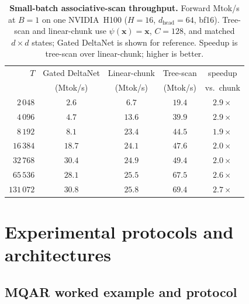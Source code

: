 \documentclass{article}
\newcommand{\1}{\bm{1}}
\def\vx{{\bm{x}}}
\newcommand{\seql}{T}
\theoremstyle{definition}
\begin{document}
\begin{table}[htbp]
    \centering\footnotesize
    \caption{\textbf{Small-batch associative-scan throughput.}
    Forward Mtok/s at $B{=}1$ on one NVIDIA~H100
    ($H{=}16$, $d_\text{head}{=}64$, bf16). Tree-scan and linear-chunk use
    $\psi(\vx){=}\vx$, $C{=}128$, and matched $d{\times}d$ states; Gated DeltaNet
    is shown for reference. Speedup is tree-scan over linear-chunk; higher is better.}
    \label{tab:treescan}
    \begin{tabular}{r|c|cc|c}
    \toprule
    $\seql$ & Gated DeltaNet & Linear-chunk & Tree-scan & speedup \\
        & (Mtok/s) & (Mtok/s) & (Mtok/s) & vs.\ chunk \\
    \midrule
    $2\,048$   & $2.6$  & $6.7$  & $\mathbf{19.4}$ & $2.9\times$ \\
    $4\,096$   & $4.7$  & $13.6$ & $\mathbf{39.9}$ & $2.9\times$ \\
    $8\,192$   & $8.1$  & $23.4$ & $\mathbf{44.5}$ & $1.9\times$ \\
    $16\,384$  & $18.7$ & $24.1$ & $\mathbf{47.6}$ & $2.0\times$ \\
    $32\,768$  & $30.4$ & $24.9$ & $\mathbf{49.4}$ & $2.0\times$ \\
    $65\,536$  & $28.1$ & $25.5$ & $\mathbf{67.5}$ & $2.6\times$ \\
    $131\,072$ & $30.8$ & $25.8$ & $\mathbf{69.4}$ & $2.7\times$ \\
    \bottomrule
    \end{tabular}
\end{table}



\clearpage
\section{Experimental protocols and architectures}
\label{app:experiments-extended}


\subsection{MQAR worked example and protocol}
\end{document}
